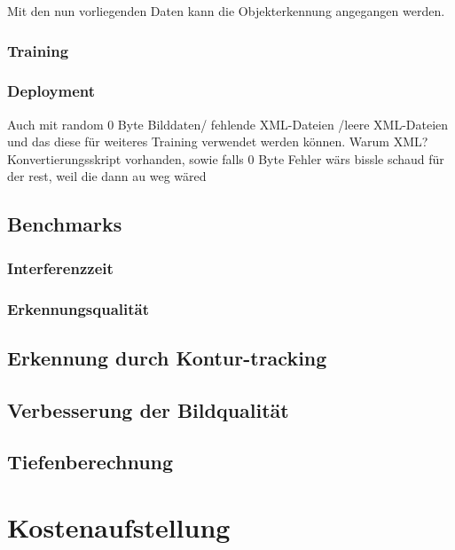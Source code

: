 Mit den nun vorliegenden Daten kann die Objekterkennung angegangen werden.

\subsubsection{Training}

\subsubsection{Deployment}

 Auch mit random 0 Byte Bilddaten/ fehlende XML-Dateien /leere XML-Dateien und das diese für weiteres Training verwendet werden können. Warum XML? Konvertierungsskript vorhanden, sowie falls 0 Byte Fehler wärs bissle schaud für der rest, weil die dann au weg wäred
\subsection{Benchmarks} \label{cap:Benchmarks}

\subsubsection{Interferenzzeit}

\subsubsection{Erkennungsqualität}

\subsection{Erkennung durch Kontur-tracking}

\subsection{Verbesserung der Bildqualität}

\subsection{Tiefenberechnung} \label{cap:calc_depth}

\section{Kostenaufstellung}

